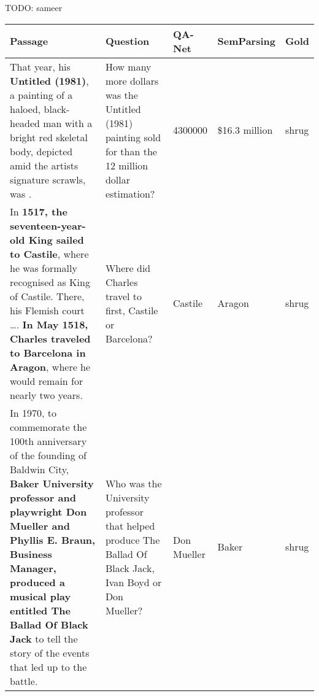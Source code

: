 TODO: sameer

\begin{table*}[t]
\centering
\footnotesize
\begin{tabular}{p{7cm}p{2.8cm}p{1.5cm}p{1.5cm}p{1.5cm}}
\toprule
{\bf Passage} & {\bf Question} & {\bf QA-Net} & {\bf SemParsing} & {\bf Gold}\\
 \midrule
 That year, his {\bf \color{teal} Untitled (1981)}, a painting of a haloed, black-headed man with a bright red skeletal body, depicted amid the artists signature scrawls, was {\bf \color{teal}{sold by Robert Lehrman for \$16.3 million, well above its  \$12 million high estimate}}.  & How many more dollars was the Untitled (1981) painting sold for than the 12 million dollar estimation? & 4300000 & \$16.3 million & shrug\\ 
 \midrule
 In {\bf \color{orange}1517, the seventeen-year-old King sailed to Castile}, where he was formally recognised as King of Castile. There, his Flemish court \ldots. {\bf \color{orange}In May 1518, Charles traveled to Barcelona in Aragon}, where he would remain for nearly two years. & Where did Charles travel to first, Castile or Barcelona? & Castile & Aragon & shrug\\
 \midrule
 In 1970, to commemorate the 100th anniversary of the founding of Baldwin City, {\bf \color{purple}Baker University professor and playwright Don Mueller and Phyllis E. Braun, Business Manager, produced a musical play entitled The Ballad Of Black Jack} to tell the story of the events that led up to the battle. & Who was the University professor that helped produce The Ballad Of Black Jack, Ivan Boyd or Don Mueller? & Don Mueller & Baker & shrug\\

\end{tabular}
\end{table*}
